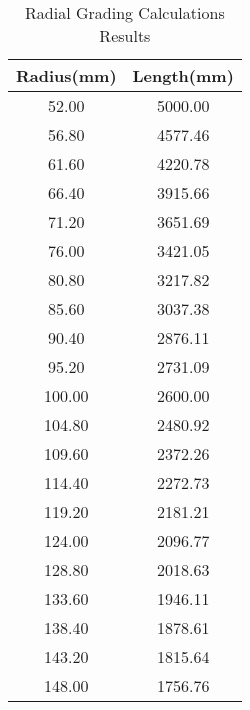\begin{table}[!htb]
\caption{Radial Grading Calculations Results}
\label{table:radialvals21}
\begin{center}
\begin{tabular}{cc}
\toprule
\textbf{Radius(mm)} & \textbf{Length(mm)} \\ \toprule
52.00 & 5000.00 \\ 
56.80 & 4577.46 \\ 
61.60 & 4220.78 \\ 
66.40 & 3915.66 \\ 
71.20 & 3651.69 \\ 
76.00 & 3421.05 \\ 
80.80 & 3217.82 \\ 
85.60 & 3037.38 \\ 
90.40 & 2876.11 \\ 
95.20 & 2731.09 \\ 
100.00 & 2600.00 \\ 
104.80 & 2480.92 \\ 
109.60 & 2372.26 \\ 
114.40 & 2272.73 \\ 
119.20 & 2181.21 \\ 
124.00 & 2096.77 \\ 
128.80 & 2018.63 \\ 
133.60 & 1946.11 \\ 
138.40 & 1878.61 \\ 
143.20 & 1815.64 \\ 
148.00 & 1756.76 \\ 
\bottomrule
\end{tabular}
\end{center}
\end{table}
